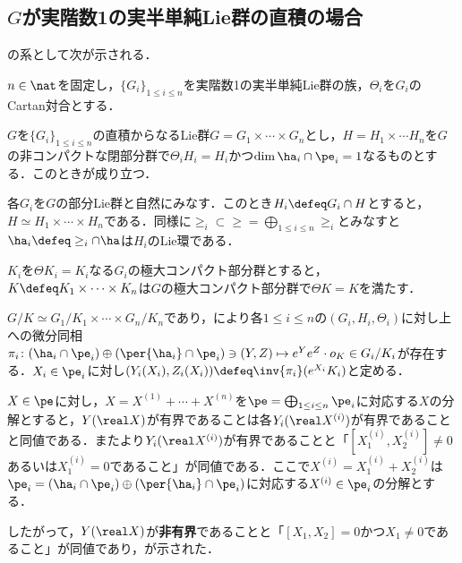 \subsection{$G$が実階数1の実半単純Lie群の直積の場合}
の系として次が示される．
\begin{cor}\label{cor:0113-main}
  $n\in \nat$を固定し，$\{G_i \}_{1\leq i\leq n} $を実階数1の実半単純Lie群の族，$\Theta_i $を$G_i$のCartan対合とする．
  
  $G$を$\{G_i \}_{1\leq i\leq n} $の直積からなるLie群$G = G_1\times \cdots \times G_n $とし，$H = H_1\times \cdots H_n $を$G$の非コンパクトな閉部分群で$\Theta_i H_i = H_i$かつ$\dim \ha_i \cap\pe_i = 1$なるものとする．このときが成り立つ．
\end{cor}


\begin{npfwn}
  各$G_i $を$G$の部分Lie群と自然にみなす．このとき$H_i\defeq G_i\cap H$とすると，$H \simeq H_1\times\cdots  \times H_n  $である．同様に$\ge_i\subset \ge = \bigoplus_{1\leq i\leq n}\ge_i $とみなすと$\ha_i\defeq \ge_i\cap \ha $は$H_i$のLie環である．

  $K_i$を$\Theta K_i = K_i $なる$G_i$の極大コンパクト部分群とすると，$K \defeq K_1\times \cdots \times K_n $は$G$の極大コンパクト部分群で$\Theta K = K $を満たす．

  $G/K\simeq G_1/K_1\times \cdots \times G_n/K_n $であり，により各$1\leq i\leq n$の$(G_i, H_i, \Theta_i) $に対し上への微分同相$\pi_i\colon  (\ha_i\cap\pe_i)\oplus (\per{\ha_i}\cap \pe_i) \ni (Y, Z)\mapsto e^{Y}e^{Z}\cdot o_K \in G_i/K_i $が存在する．$X_i\in \pe_i $に対し$(Y_i(X_i), Z_i(X_i))\defeq \inv{\pi_i}(e^{X_i}K_i) $と定める．

  $X\in \pe$に対し，$X = X^{(1)} +\cdots + X^{(n)} $を$\pe = \bigoplus_{1\leq i\leq n}\pe_i $に対応する$X$の分解とすると，$Y(\real X) $が有界であることは各$Y_i(\real X^{(i)}) $が有界であることと同値である．またより$Y_i(\real X^{(i)}) $が有界であることと「$[X_1^{(i)}, X_2^{(i)} ] \neq 0 $あるいは$X^{(i)}_1 = 0 $であること」が同値である．ここで$X^{(i)} =  X_1^{(i)} + X_2^{(i)}$は$\pe_i = (\ha_i\cap\pe_i)\oplus (\per{\ha_i}\cap\pe_i) $に対応する$X^{(i)}\in \pe_i $の分解とする．

  したがって，$Y(\real X) $が\textbf{非有界}であることと「$[X_1, X_2] = 0 $かつ$X_1 \neq 0 $であること」が同値であり，が示された．  
\end{npfwn}
